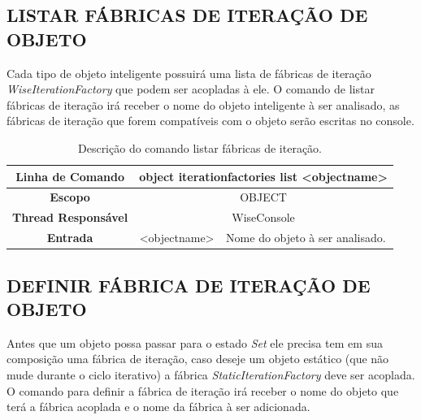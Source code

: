 \subsection{LISTAR FÁBRICAS DE ITERAÇÃO DE OBJETO}\label{sec:iteration_factories_list}

Cada tipo de objeto inteligente possuirá uma lista de fábricas de iteração \textit{WiseIterationFactory} que podem ser acopladas à ele. O comando de listar fábricas de iteração irá receber o nome do objeto inteligente à ser analisado, as fábricas de iteração que forem compatíveis com o objeto serão escritas no console.

\begin{center}
	\begin{table}[!htbp]
		\begin{tabularx}{\textwidth}{c|c|X}
			\toprule
			\textbf{Linha de Comando} & \multicolumn{2}{c}{object iteration\underline{\space\space}factories list <object\underline{\space\space}name>} \\
			\midrule
			\textbf{Escopo} & \multicolumn{2}{c}{OBJECT} \\
			\hline
			\textbf{Thread Responsável} & \multicolumn{2}{c}{WiseConsole} \\
			\hline
			\textbf{Entrada} & <object\underline{\space\space}name> & Nome do objeto à ser analisado. \\
			\bottomrule
		\end{tabularx}
		\caption{Descrição do comando listar fábricas de iteração.}
		\label{tab:iteration_factories_list}
	\end{table}
\end{center}

\subsection{DEFINIR FÁBRICA DE ITERAÇÃO DE OBJETO}\label{sec:iteration_factories_set}

Antes que um objeto possa passar para o estado \textit{Set} ele precisa tem em sua composição uma fábrica de iteração, caso deseje um objeto estático (que não mude durante o ciclo iterativo) a fábrica \textit{StaticIterationFactory} deve ser acoplada. O comando para definir a fábrica de iteração irá receber o nome do objeto que terá a fábrica acoplada e o nome da fábrica à ser adicionada.

